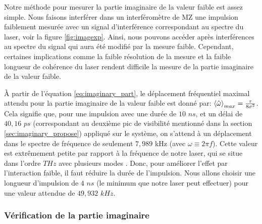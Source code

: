 \label{sec:imaginary_results}
\begin{onehalfspace}
    Notre méthode pour mesurer la partie imaginaire de la valeur faible 
    est assez simple. Nous faisons interférer dans un 
    interféromètre de MZ une impulsion faiblement 
    mesurée avec un signal d'interférence 
    correspondant au spectre du laser, voir la figure \ref{fig:imagexp}. 
    Ainsi, nous pouvons accéder 
    après interférences au spectre du signal qui aura été modifié 
    par la mesure faible. Cependant, 
    certaines implications comme 
    la faible résolution de la mesure et la faible longueur 
    de cohérence du laser rendent difficile la 
    mesure de la partie imaginaire de la valeur faible.
\end{onehalfspace}


\begin{onehalfspace}

     \noindent À partir de l'équation \ref{eq:imaginary_part}, le 
     déplacement fréquentiel maximal attendu pour la partie imaginaire de la valeur faible est donné par:
    $\expval{\hat{\omega}}_{max} = \frac{\tau}{8\sigma^2}$. 
    Cela signifie que, pour une impulsion avec une durée de 
    $10$ $ns$, et un délai de $40,16$ $ps$ (correspondant au 
    deuxième pic de visibilité mentionné dans la section 
    \ref{sec:imaginary_propose}) appliqué sur le système, on 
    s'attend à un déplacement dans le spectre de fréquence de seulement 
    $7,989$ kHz (avec $\omega \equiv 2\pi f$). Cette valeur est 
    extrêmement petite par rapport à la fréquence de notre laser, qui se 
    situe dans l'ordre $THz$ avec plusieurs modes \cite{ThorlabsNPL64B}. 
    Donc, pour améliorer l'effet par l'interaction faible,
    il faut réduire la durée de l'impulsion. 
    Nous allons choisir une longueur d'impulsion de $4$ $ns$ (le minimum 
    que notre laser peut effectuer) pour une valeur attendue de $49,932$ $kHz$.
    
    \subsubsection{Vérification de la partie imaginaire}


\end{onehalfspace}
